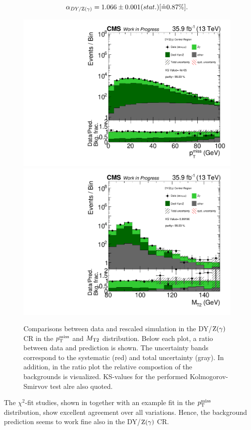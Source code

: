 \begin{equation}\label{eq:AlphaDY}
 \alpha_{DY/\mathrm{Z}(\gamma)}=1.066 \pm 0.001 (stat.) [\hat{=}0.87\%].
\end{equation}

\begin{figure}[tbp]
 \centering
 \includegraphics[width=\pairwidth]{figures/plots_CR_dy/CRDY_LL_nom_met_log}
 \includegraphics[width=\pairwidth]{figures/plots_CR_dy/CRDY_LL_nom_mt2_log}
 \caption{Comparisons between data and rescaled simulation in the DY/$\mathrm{Z}(\gamma)$ CR in the $p_{\mathrm{T}}^\text{miss}$ and $M_{\mathrm{T2}}$ distribution. Below each plot, a ratio between data and prediction is shown. The uncertainty bands correspond to the systematic (red) and total uncertainty (gray). In addition, in the ratio plot the relative compostion of the backgrounds is visualized. KS-values for the performed Kolmogorov-Smirvov test alre also quoted.}
 \label{fig:CRDY}
\end{figure}
The $\chi^2$-fit studies, shown in  together with an example fit in the $p_{\mathrm{T}}^\text{miss}$ distribution, show excellent agreement over all variations. Hence, the background prediction seems to work fine also in the DY/$\mathrm{Z}(\gamma)$ CR.

